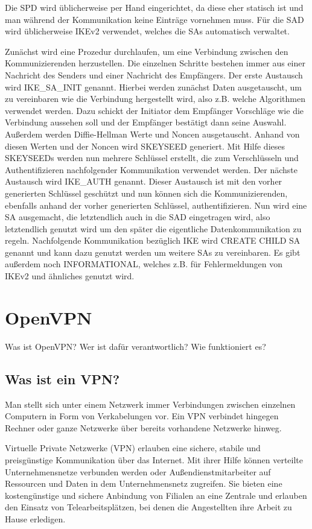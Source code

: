 \documentclass[12pt]{scrartcl}
\begin{document}
Die SPD wird üblicherweise per Hand eingerichtet, da diese eher statisch ist und man während der Kommunikation keine Einträge vornehmen muss. Für die SAD wird üblicherweise IKEv2 verwendet, welches die SAs automatisch verwaltet.

Zunächst wird eine Prozedur durchlaufen, um eine Verbindung zwischen den Kommunizierenden herzustellen. Die einzelnen Schritte bestehen immer aus einer Nachricht des Senders und einer Nachricht des Empfängers. Der erste Austausch wird IKE\_SA\_INIT genannt. Hierbei werden zunächst Daten ausgetauscht, um zu vereinbaren wie die Verbindung hergestellt wird, also z.B. welche Algorithmen verwendet werden. Dazu schickt der Initiator dem Empfänger Vorschläge wie die Verbindung aussehen soll und der Empfänger bestätigt dann seine Auswahl. Außerdem werden Diffie-Hellman Werte und Noncen ausgetauscht. Anhand von diesen Werten und der Noncen wird SKEYSEED generiert. Mit Hilfe dieses SKEYSEEDs werden nun mehrere Schlüssel erstellt, die zum Verschlüsseln und Authentifizieren nachfolgender Kommunikation verwendet werden. Der nächste Austausch wird IKE\_AUTH genannt. Dieser Austausch ist mit den vorher generierten Schlüssel geschützt und nun können sich die Kommunizierenden, ebenfalls anhand der vorher generierten Schlüssel, authentifizieren. Nun wird eine SA ausgemacht, die letztendlich auch in die SAD eingetragen wird, also letztendlich genutzt wird um den später die eigentliche Datenkommunikation zu regeln.
Nachfolgende Kommunikation bezüglich IKE wird CREATE CHILD SA genannt und kann dazu genutzt werden um weitere SAs zu vereinbaren. Es gibt außerdem noch INFORMATIONAL, welches z.B. für Fehlermeldungen von IKEv2 und ähnliches genutzt wird.
\section{OpenVPN}
%
Was ist OpenVPN? Wer ist dafür verantwortlich? Wie funktioniert es?
\subsection{Was ist ein VPN?}
Man stellt sich unter einem Netzwerk immer Verbindungen zwischen einzelnen Computern in Form von Verkabelungen vor. Ein VPN verbindet hingegen Rechner oder ganze Netzwerke über bereits vorhandene Netzwerke hinweg.

Virtuelle Private Netzwerke (VPN) erlauben eine sichere, stabile und preisgünstige Kommunikation über das Internet. Mit ihrer Hilfe können verteilte Unternehmensnetze verbunden werden oder Außendienstmitarbeiter auf Ressourcen und Daten in dem Unternehmensnetz zugreifen. Sie bieten eine kostengünstige und sichere Anbindung von Filialen an eine Zentrale und erlauben den Einsatz von Telearbeitsplätzen, bei denen die Angestellten ihre Arbeit zu Hause erledigen.
\end{document}
